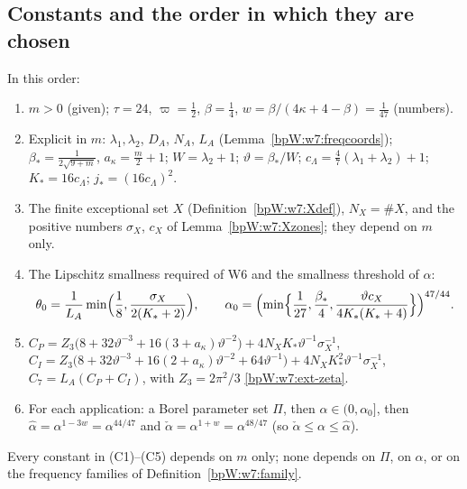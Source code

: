 
\subsection{Constants and the order in which they are chosen}\label{bpW:w7:constants}

\begin{definition}[W7 constants]\label{bpW:w7:constdef}
In this order:
\begin{enumerate}[label=(C\arabic*)]
\item $m>0$ (given); $\tau=24$, $\varpi=\frac12$, $\beta=\frac14$, $w=\beta/(4\kappa+4-\beta)=\frac1{47}$ (numbers).
\item Explicit in $m$: $\lambda_1,\lambda_2$, $D_A$, $N_A$, $L_A$ (Lemma~\ref{bpW:w7:freqcoords});
  $\beta_*=\frac1{2\sqrt{9+m}}$, $a_\kappa=\frac m2+1$; $W=\lambda_2+1$; $\vartheta=\beta_*/W$;
  $c_\Lambda=\frac47(\lambda_1+\lambda_2)+1$; $K_*=16c_\Lambda$; $j_*=(16c_\Lambda)^2$.
\item The finite exceptional set $X$ (Definition~\ref{bpW:w7:Xdef}), $N_X=\# X$, and the positive numbers
  $\sigma_X$, $c_X$ of Lemma~\ref{bpW:w7:Xzones}; they depend on $m$ only.
\item The Lipschitz smallness required of W6 and the smallness threshold of $\alpha$:
  \[\theta_0=\frac1{L_A}\min\Bigl(\frac18,\frac{\sigma_X}{2(K_*+2)}\Bigr),\qquad
  \alpha_0=\Bigl(\min\Bigl\{\frac1{27},\frac{\beta_*}4,\frac{\vartheta c_X}{4K_*(K_*+4)}\Bigr\}\Bigr)^{47/44}.\]
\item $C_P=Z_3\bigl(8+32\vartheta^{-3}+16(3+a_\kappa)\vartheta^{-2}\bigr)+4N_XK_*\vartheta^{-1}\sigma_X^{-1}$,
  $C_I=Z_3\bigl(8+32\vartheta^{-3}+16(2+a_\kappa)\vartheta^{-2}+64\vartheta^{-1}\bigr)+4N_XK_*^2\vartheta^{-1}\sigma_X^{-1}$,
  $C_7=L_A(C_P+C_I)$, with $Z_3=2\pi^2/3$ \ref{bpW:w7:ext-zeta}.
\item For each application: a Borel parameter set $\Pi$, then $\alpha\in(0,\alpha_0]$, then
  $\hat\alpha=\alpha^{1-3w}=\alpha^{44/47}$ and $\check\alpha=\alpha^{1+w}=\alpha^{48/47}$ (so $\check\alpha\le\alpha\le\hat\alpha$).
\end{enumerate}
Every constant in (C1)--(C5) depends on $m$ only; none depends on $\Pi$, on $\alpha$, or on the frequency families of
Definition~\ref{bpW:w7:family}.
\end{definition}

